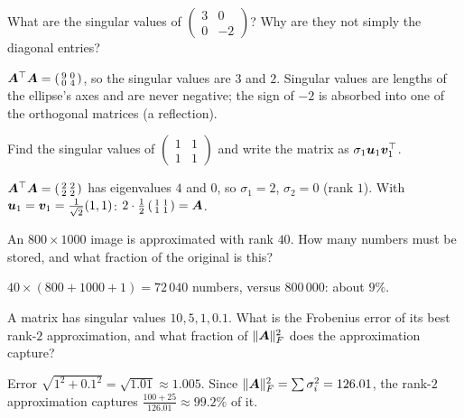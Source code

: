 \sectionexercises

\begin{exercise}
What are the singular values of $\left(\begin{smallmatrix} 3 & 0\\ 0 &
-2\end{smallmatrix}\right)$? Why are they not simply the diagonal entries?
\end{exercise}
\begin{solution}
$\bm{A}^\top\bm{A} = \left(\begin{smallmatrix} 9 & 0\\ 0 & 4\end{smallmatrix}\right)$,
so the singular values are $3$ and $2$. Singular values are lengths of the
ellipse's axes and are never negative; the sign of $-2$ is absorbed into one
of the orthogonal matrices (a reflection).
\end{solution}

\begin{exercise}
Find the singular values of $\left(\begin{smallmatrix} 1 & 1\\ 1 &
1\end{smallmatrix}\right)$ and write the matrix as $\sigma_1\bm{u}_1\bm{v}_1^\top$.
\end{exercise}
\begin{solution}
$\bm{A}^\top\bm{A} = \left(\begin{smallmatrix} 2 & 2\\ 2 & 2\end{smallmatrix}\right)$
has eigenvalues $4$ and $0$, so $\sigma_1 = 2$, $\sigma_2 = 0$ (rank $1$). With
$\bm{u}_1 = \bm{v}_1 = \tfrac{1}{\sqrt2}(1, 1)$:
$2\cdot\tfrac12\left(\begin{smallmatrix} 1 & 1\\ 1 & 1\end{smallmatrix}\right)
= \bm{A}$.
\end{solution}

\begin{exercise}
An $800\times1000$ image is approximated with rank $40$. How many numbers must
be stored, and what fraction of the original is this?
\end{exercise}
\begin{solution}
$40\times(800 + 1000 + 1) = 72\,040$ numbers, versus $800\,000$: about $9\%$.
\end{solution}

\begin{exercise}
A matrix has singular values $10, 5, 1, 0.1$. What is the Frobenius error of
its best rank-$2$ approximation, and what fraction of $\lVert\bm{A}\rVert_F^2$ does the
approximation capture?
\end{exercise}
\begin{solution}
Error $\sqrt{1^2 + 0.1^2} = \sqrt{1.01} \approx 1.005$. Since
$\lVert\bm{A}\rVert_F^2 = \sum\sigma_i^2 = 126.01$, the rank-$2$ approximation captures
$\tfrac{100 + 25}{126.01} \approx 99.2\%$ of it.
\end{solution}

